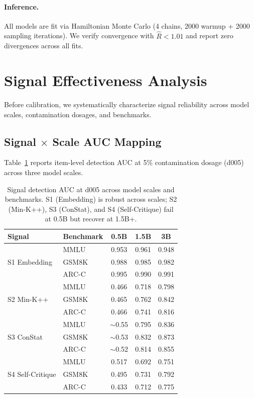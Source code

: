\documentclass[11pt,a4paper]{article}
\begin{document}
\paragraph{Inference.}
All models are fit via Hamiltonian Monte Carlo (4 chains, 2000 warmup + 2000 sampling iterations).
We verify convergence with $\hat{R} < 1.01$ and report zero divergences across all fits.

\section{Signal Effectiveness Analysis}
\label{sec:signal_analysis}

Before calibration, we systematically characterize signal reliability across model scales, contamination dosages, and benchmarks.

\subsection{Signal $\times$ Scale AUC Mapping}

Table~\ref{tab:signal_scale_auc} reports item-level detection AUC at 5\% contamination dosage (d005) across three model scales.

\begin{table}[t]
\centering
\small
\caption{Signal detection AUC at d005 across model scales and benchmarks. S1 (Embedding) is robust across scales; S2 (Min-K++), S3 (ConStat), and S4 (Self-Critique) fail at 0.5B but recover at 1.5B+.}
\label{tab:signal_scale_auc}
\begin{tabular}{llccc}
\toprule
\textbf{Signal} & \textbf{Benchmark} & \textbf{0.5B} & \textbf{1.5B} & \textbf{3B} \\
\midrule
\multirow{3}{*}{S1 Embedding}
 & MMLU   & 0.953 & 0.961 & 0.948 \\
 & GSM8K  & 0.988 & 0.985 & 0.982 \\
 & ARC-C  & 0.995 & 0.990 & 0.991 \\
\midrule
\multirow{3}{*}{S2 Min-K++}
 & MMLU   & 0.466 & 0.718 & 0.798 \\
 & GSM8K  & 0.465 & 0.762 & 0.842 \\
 & ARC-C  & 0.466 & 0.741 & 0.816 \\
\midrule
\multirow{3}{*}{S3 ConStat}
 & MMLU   & $\sim$0.55 & 0.795 & 0.836 \\
 & GSM8K  & $\sim$0.53 & 0.832 & 0.873 \\
 & ARC-C  & $\sim$0.52 & 0.814 & 0.855 \\
\midrule
\multirow{3}{*}{S4 Self-Critique}
 & MMLU   & 0.517 & 0.692 & 0.751 \\
 & GSM8K  & 0.495 & 0.731 & 0.792 \\
 & ARC-C  & 0.433 & 0.712 & 0.775 \\
\bottomrule
\end{tabular}
\end{table}
\end{document}
